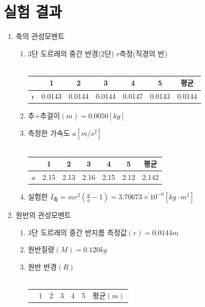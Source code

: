 \documentclass[12pt,a4paper]{article}
\begin{document}
\section{실험 결과}
\begin{enumerate}
    \item 축의 관성모멘트
        \begin{enumerate}
            \item 3단 도르래의 중간 반경(2단) $r$측정(직경의 반) \\
                \\
                \begin{tabular}{|c|c|c|c|c|c|c|}
                    \hline
                    &1&2&3&4&5&평균 \\
                    \hline
                    r&0.0143&0.0144&0.0144&0.0147&0.0143&0.0144 \\
                    \hline
                \end{tabular}
            \item 추+추걸이$(m)=0.0050[kg]$
            \item 측정한 가속도 $a[m/s^2]$ \\
                \\
                \begin{tabular}{|c|c|c|c|c|c|c|}
                    \hline
                    &1&2&3&4&5&평균 \\
                    \hline
                    $a$&2.15&2.13&2.16&2.15&2.12&2.142 \\
                    \hline
                \end{tabular}
            \item 실험한 $I_{\textrm{축}}=mr^2(\frac{g}{a}-1)=
            3.70673\times10^{-6}[kg\cdot m^2]$
        \end{enumerate}
        \clearpage
    \item 원반의 관성모멘트
        \begin{enumerate}
            \item 3단 도르래의 중간 반지름 측정값$(r)=0.0144m$
            \item 원반질량$(M)=0.120kg$
            \item 원반 반경$(R)$ \\
                \\
                \begin{tabular}{|c|c|c|c|c|c|c|}
                    \hline
                    &1&2&3&4&5&평균$(m)$ \\

\end{tabular}
\end{enumerate}
\end{enumerate}
\end{document}
